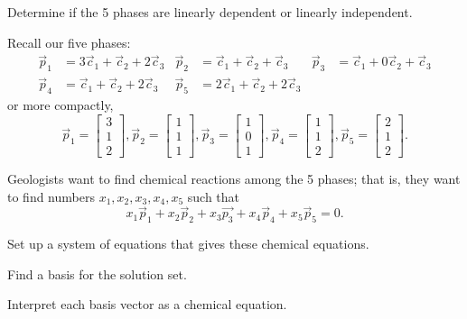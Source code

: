 \begin{applicationActivities}
\begin{activity}{5}
Determine if the 5 phases are linearly dependent or linearly independent.
\end{activity}

\begin{activity}{15}
Recall our five phases:
\begin{align*}
\vec{p}_1 &= 3\vec{c}_1 + \vec{c}_2 + 2 \vec{c}_3 & \vec{p}_2 &= \vec{c}_1 +\vec{c}_2 + \vec{c}_3  &
\vec{p}_3 &= \vec{c}_1 + 0\vec{c}_2 +  \vec{c}_3 \\
\vec{p}_4 &= \vec{c}_1 +\vec{c}_2 + 2\vec{c}_3 &  \vec{p}_5 &= 2\vec{c}_1 + \vec{c}_2 + 2 \vec{c}_3 
\end{align*}
or more compactly,
$$ \vec{p}_1 = \begin{bmatrix} 3 \\ 1 \\ 2 \end{bmatrix},
\vec{p}_2 = \begin{bmatrix} 1 \\ 1 \\ 1 \end{bmatrix},
\vec{p}_3 = \begin{bmatrix} 1 \\ 0 \\ 1 \end{bmatrix},
\vec{p}_4 = \begin{bmatrix} 1 \\ 1 \\ 2 \end{bmatrix},
\vec{p}_5 = \begin{bmatrix} 2 \\ 1 \\ 2 \end{bmatrix}.$$

Geologists want to find chemical reactions among the 5 phases; that is, they want to find numbers $x_1,x_2,x_3,x_4,x_5$ such that $$x_1\vec{p}_1+x_2\vec{p}_2+x_3\vec{p_3}+x_4\vec{p}_4+x_5\vec{p}_5 = 0.$$

\begin{subactivity}
Set up  a system of equations that gives these chemical equations.
\end{subactivity}
\begin{subactivity}
Find a basis for the solution set.
\end{subactivity}
\begin{subactivity}
Interpret each basis vector as a chemical equation. 
\end{subactivity}

\end{activity}


\end{applicationActivities}
